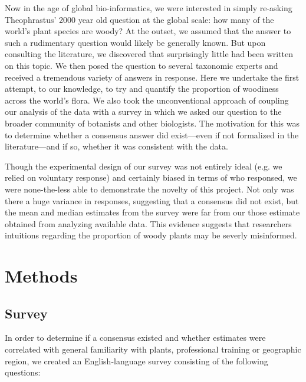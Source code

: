\documentclass[12pt]{article}
\begin{document}
Now in the age of global bio-informatics, we were interested in simply re-asking Theophrastus' 2000 year old question at the global scale: how many of the world's plant species are woody? At the outset, we assumed that the answer to such a rudimentary question would likely be generally known. But upon consulting the literature, we discovered that surprisingly little had been written on this topic. We then posed the question to several taxonomic experts and received a tremendous variety of answers in response. Here we undertake the first attempt, to our knowledge, to try and quantify the proportion of woodiness across the world's flora. We also took the unconventional approach of coupling our analysis of the data with a survey in which we asked our question to the broader community of botanists and other biologists. The motivation for this was to determine whether a consensus answer did exist---even if not formalized in the literature---and if so, whether it was consistent with the data.

Though the experimental design of our survey was not entirely ideal (e.g. we relied on voluntary response) and certainly biased in terms of who responsed, we were none-the-less able to demonstrate the novelty of this project. Not only was there a huge variance in responses, suggesting that a consensus did not exist, but the mean and median estimates from the survey were far from our those estimate obtained from analyzing available data. This evidence suggests that researchers intuitions regarding the proportion of woody plants may be severly misinformed.

\section{Methods}
\subsection{Survey}
In order to determine if a consensus existed and whether estimates were correlated with general familiarity with plants, professional training or geographic region, we created an English-language survey consisting of the following questions:
\end{document}
